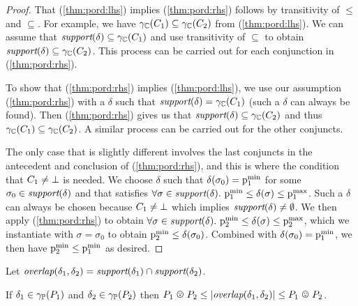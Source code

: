 {\begin{proof}
That (\ref{thm:pord:lhs}) implies (\ref{thm:pord:rhs}) follows by transitivity of $\leq$ and $\subseteq$.  For example, we have $\gamma_{\mathbb{C}}(C_{1}) \subseteq \gamma_{\mathbb{C}}(C_{2})$ from (\ref{thm:pord:lhs}).  We can assume that $\textit{support}(\delta) \subseteq \gamma_{\mathbb{C}}(C_{1})$ and use transitivity of $\subseteq$ to obtain $\textit{support}(\delta) \subseteq \gamma_{\mathbb{C}}(C_{2})$.  This process can be carried out for each conjunction in (\ref{thm:pord:rhs}).

To show that (\ref{thm:pord:rhs}) implies (\ref{thm:pord:lhs}), we use our assumption (\ref{thm:pord:rhs}) with a $\delta$ such that $\textit{support}(\delta) = \gamma_{\mathbb{C}}(C_{1})$ (such a $\delta$ can always be found).  Then (\ref{thm:pord:rhs}) gives us that $\textit{support}(\delta) \subseteq \gamma_{\mathbb{C}}(C_{2})$ and thus $\gamma_{\mathbb{C}}(C_{1}) \subseteq \gamma_{\mathbb{C}}(C_{2})$.  A similar process can be carried out for the other conjuncts.

The only case that is slightly different involves the last conjuncts in the antecedent and conclusion of (\ref{thm:pord:rhs}), and this is where the condition that $C_{1} \neq \bot$ is needed.  We choose $\delta$ such that $\delta(\sigma_0) = \mathrm{p}^\mathrm{min}_{1}$ for some $\sigma_0 \in \textit{support}(\delta)$ and that satisfies $\forall \sigma \in \textit{support}(\delta).\ \mathrm{p}^\mathrm{min}_{1} \leq \delta(\sigma) \leq \mathrm{p}^\mathrm{max}_{1}$.  Such a $\delta$ can always be chosen because $C_{1} \neq \bot$ which implies $\textit{support}(\delta) \neq \emptyset$.  We then apply (\ref{thm:pord:rhs}) to obtain $\forall \sigma \in \textit{support}(\delta).\ \mathrm{p}^\mathrm{min}_{2} \leq \delta(\sigma) \leq \mathrm{p}^\mathrm{max}_{2}$, which we instantiate with $\sigma = \sigma_0$ to obtain $\mathrm{p}^\mathrm{min}_{2} \leq \delta(\sigma_0)$.  Combined with $\delta(\sigma_0) = \mathrm{p}^\mathrm{min}_{1}$, we then have $\mathrm{p}^\mathrm{min}_{2} \leq \mathrm{p}^\mathrm{min}_{1}$ as desired.
\end{proof}
}

\begin{definition}
Let $\textit{overlap}(\delta_1,\delta_2) = \textit{support}(\delta_1) \cap \textit{support}(\delta_2)$.
\end{definition}

\begin{lemma}
\label{lem:pp:plus:overlap}
 If $\delta_1 \in \gamma_{\mathbb{P}}(P_{1})$ and $\delta_2 \in \gamma_{\mathbb{P}}(P_{2})$ then $\pessoverlap{\ppa}{\ppb} \leq \setsize{\overlap{\delta_1}{\delta_2}} \leq \optoverlap{\ppa}{\ppb}$.
\end{lemma}

